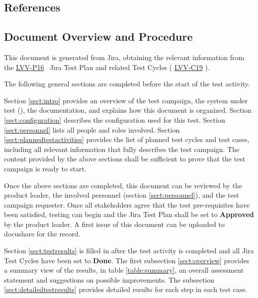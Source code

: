 \documentclass[DM,lsstdraft,STR,toc]{lsstdoc}
\begin{document}
\subsection{References}
\label{sect:references}
\renewcommand{\refname}{}


\subsection{Document Overview and Procedure}
\label{sect:docoverview}

This document is generated from Jira, obtaining the relevant information from the 
\href{https://jira.lsstcorp.org/secure/Tests.jspa#/testPlan/LVV-P16}{LVV-P16}
~Jira Test Plan and related Test Cycles (
\href{https://jira.lsstcorp.org/secure/Tests.jspa#/testCycle/LVV-C19}{LVV-C19}
).

The following general sections are completed before the start of the test activity.

Section \ref{sect:intro} provides an overview of the test campaign, the system under test (\product{}), the documentation, and explains how this document is organized.
Section \ref{sect:configuration}  describes the configuration used for this test.
Section \ref{sect:personnel} lists all people and roles involved.
Section \ref{sect:plannedtestactivities} provides the list of planned test cycles and test cases, including all relevant information that fully describes the test campaign.
The content provided by the above sections shall be sufficient to prove that the test campaign is ready to start.

Once the above sections are completed, this document can be reviewed by the product leader, the involved personnel (section \ref{sect:personnel}), and the test campaign requester.
Once all stakeholders agree that the test pre-requisites have been satisfied, testing can begin and the Jira Test Plan shall be set to {\bf Approved} by the \product{} product leader.
A first issue of this document can be uploaded to docushare for the record.

Section \ref{sect:testresults} is filled in after the test activity is completed and all Jira Test Cycles have been set to {\bf Done}.
The first subsection \ref{sect:overview} provides a summary view of the results, in table \ref{table:summary}, 
an overall assessment statement and suggestions on possible improvements.
The subsection \ref{sect:detailedtestresults} provides detailed results for each step in each test case.
\end{document}

